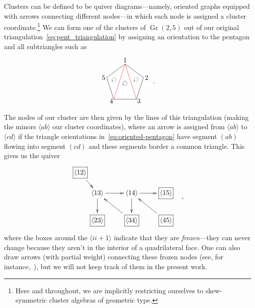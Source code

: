 \documentclass[12pt]{article}
\DeclareMathOperator{\Gr}{Gr}
\def\ket#1{\langle #1 \rangle}
\def\drawLabeledPentagon{
\coordinate (P1) at (90:1);
\coordinate (P2) at (18:1);
\coordinate (P3) at (306:1);
\coordinate (P4) at (234:1);
\coordinate (P5) at (162:1);
\draw[white,fill=white] (0,0) circle (1cm);
\draw (P1) -- (P2) -- (P3) -- (P4) -- (P5) -- cycle;
\draw (0,1.2) node {1};
\draw (.9,.3) node[anchor=west] {2};
\draw (.5,-.9) node[anchor=west] {3};
\draw (-.5,-.9) node[anchor=east] {4};
\draw (-.9,.3) node[anchor=east] {5};
}
\begin{document}
Clusters can be defined to be quiver diagrams---namely, oriented graphs equipped with arrows connecting different nodes---in which each node is assigned a cluster coordinate.\footnote{Here and throughout, we are implicitly restricting ourselves to skew-symmetric cluster algebras of geometric type.} We can form one of the clusters of $\Gr(2,5)$ out of our original triangulation~\eqref{eq:pent_triangulation} by assigning an orientation to the pentagon and all subtriangles such as
\begin{equation}\label{eq:oriented-pentagon}
\begin{gathered}
\begin{tikzpicture}
  \drawLabeledPentagon
  \draw[color=red] (P1) -- (P3);
  \draw[color=red] (P1) -- (P4);
  \draw (18:.6) node[rotate=144] {$\circlearrowleft$};
  \draw (0:0) node[rotate=144] {$\circlearrowleft$};
  \draw (162:.6) node[rotate=144] {$\circlearrowleft$};
\end{tikzpicture} 
\end{gathered} \ .
\end{equation}
The nodes of our cluster are then given by the lines of this triangulation (making the minors $\ket{ab}$ our cluster coordinates), where an arrow is assigned from $\ket{ab}$ to $\ket{cd}$ if the triangle orientations in~\eqref{eq:oriented-pentagon} have segment $(ab)$ flowing into segment $(cd)$ and these segments border a common triangle. This gives us the quiver
\begin{equation}\label{eq:gr25-seed}
\begin{gathered}
\begin{xy} 0;<1pt,0pt>:<0pt,-1pt>::
	(25,30) *+{\langle 13\rangle} ="0",
	(75,30) *+{\langle 14\rangle} ="1",
	(125,30) *+{\framebox[5ex]{$\langle 15\rangle$}} ="2",
	(125,70) *+{\framebox[5ex]{$\langle 45\rangle$}} ="3",
	(75,70) *+{\framebox[5ex]{$\langle 34\rangle$}} ="4",
	(25,70) *+{\framebox[5ex]{$\langle 23\rangle$}} ="5",
	(0,0) *+{\framebox[5ex]{$\langle 12\rangle$}} ="6",
	(145,75) *+{},
	"0", {\ar"1"},
	"4", {\ar"0"},
	"0", {\ar"5"},
	"6", {\ar"0"},
	"1", {\ar"2"},
	"3", {\ar"1"},
	"1", {\ar"4"},
\end{xy}
\end{gathered} ,
\end{equation}
where the boxes around the $\ket{ii+1}$ indicate that they are \emph{frozen}---they can never change because they aren't in the interior of a quadrilateral face. One can also draw arrows (with partial weight) connecting these frozen nodes (see, for instance,~\cite{ArkaniHamed:2012nw}), but we will not keep track of them in the present work. 
\end{document}
